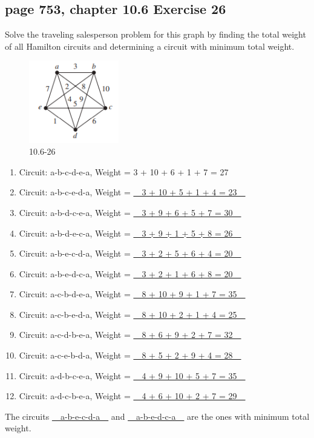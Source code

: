 \documentclass[sigconf]{acmart}
\begin{document}
\subsection{page 753, chapter 10.6 Exercise 26}
\begin{shaded}
    Solve the traveling salesperson problem for this graph by finding the total weight of all Hamilton circuits and determining a circuit with minimum total weight.
\end{shaded}
\begin{figure}[h]
    \centering
    \includegraphics[width=0.35\textwidth]{10.6-26.png}
    \caption{10.6-26}
    \label{fig:c}
\end{figure}
\begin{enumerate}[label=(\alph*)]
    \item Circuit: a-b-c-d-e-a, Weight = 3 + 10 + 6 + 1 + 7 = 27
	\item Circuit: a-b-c-e-d-a, Weight = \uline{~~3 + 10 + 5 + 1 + 4 = 23~~}
	\item Circuit: a-b-d-c-e-a, Weight = \uline{~~3 + 9 + 6 + 5 + 7 = 30~~}
	\item Circuit: a-b-d-e-c-a, Weight = \uline{~~3 + 9 + 1 + 5 + 8 = 26~~}
	
	\item Circuit: a-b-e-c-d-a, Weight = \uline{~~3 + 2 + 5 + 6 + 4 = 20~~}
	\item Circuit: a-b-e-d-c-a, Weight = \uline{~~3 + 2 + 1 + 6 + 8 = 20~~}
	\item Circuit: a-c-b-d-e-a, Weight = \uline{~~8 + 10 + 9 + 1 + 7 = 35~~}
	\item Circuit: a-c-b-e-d-a, Weight = \uline{~~8 + 10 + 2 + 1 + 4 = 25~~}
	
	\item Circuit: a-c-d-b-e-a, Weight = \uline{~~8 + 6 + 9 + 2 + 7 = 32~~}
	\item Circuit: a-c-e-b-d-a, Weight = \uline{~~8 + 5 + 2 + 9 + 4 = 28~~}
	\item Circuit: a-d-b-c-e-a, Weight = \uline{~~4 + 9 + 10 + 5 + 7 = 35~~}
	\item Circuit: a-d-c-b-e-a, Weight = \uline{~~4 + 6 + 10 + 2 + 7 = 29~~}
\end{enumerate}
The circuits \uline{~~a-b-e-c-d-a~~} and \uline{~~a-b-e-d-c-a~~} are the ones with minimum total weight.
\end{document}
